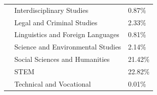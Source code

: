 \documentclass{article}
\begin{document}
\begin{table}[ht]
\begin{tabular}{@{}lll@{}}
                               & Interdisciplinary Studies & 0.87\% \\
                               & Legal and Criminal Studies & 2.33\% \\
                               & Linguistics and Foreign Languages & 0.81\% \\
                               & Science and Environmental Studies & 2.14\% \\
                               & Social Sciences and Humanities & 21.42\% \\
                               & STEM & 22.82\% \\
                               & Technical and Vocational & 0.01\% \\
    \bottomrule
    \end{tabular}
\end{table}
\end{document}
